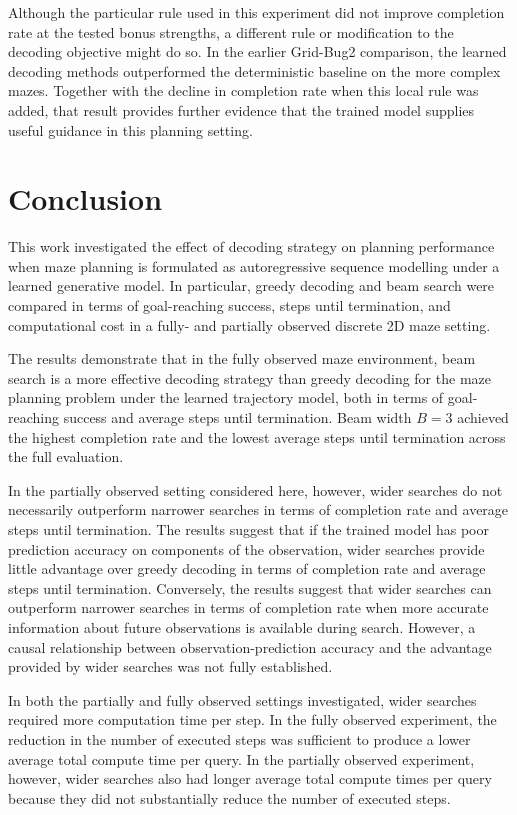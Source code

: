 ﻿\documentclass[12pt,a4paper]{article}
\theoremstyle{definition}
\begin{document}
Although the particular rule used in this experiment did not improve completion rate at the tested
bonus strengths, a different rule or modification to the decoding objective might do so. In the earlier
Grid-Bug2 comparison, the learned decoding methods outperformed the deterministic baseline on the more
complex mazes. Together with the decline in completion rate when this local rule was added, that result
provides further evidence that the trained model supplies useful guidance in this planning setting.


\section{Conclusion}

This work investigated the effect of decoding strategy on planning performance when maze planning is
formulated as autoregressive sequence modelling under a learned generative model. In particular,
greedy decoding and beam search were compared in terms of goal-reaching success, steps until termination,
and computational cost in a fully- and partially observed discrete 2D maze setting.

The results demonstrate that in the fully observed maze environment, beam search is a more effective decoding strategy than greedy
decoding for the maze planning problem under the learned trajectory model, both in terms of
goal-reaching success and average steps until termination. Beam width
$B=3$ achieved the highest completion rate and the lowest average steps until termination across the
full evaluation.

In the partially observed setting considered here, however, wider searches do not necessarily outperform narrower
searches in terms of completion rate and average steps until termination. The results suggest that if
the trained model has poor prediction accuracy on components of the observation, wider searches
provide little advantage over greedy decoding in terms of completion rate and average steps until termination.
Conversely, the results suggest that wider searches can outperform narrower searches in terms 
of completion rate when more accurate information about future observations is available 
during search. However, a causal relationship between observation-prediction accuracy and 
the advantage provided by wider searches was not fully established.

In both the partially and fully observed settings investigated, wider searches required 
more computation time per step. In the fully observed experiment, the reduction in the number 
of executed steps was sufficient to produce a lower average total compute time per query. In 
the partially observed experiment, however, wider searches also had longer average total 
compute times per query because they did not substantially reduce the number of executed 
steps.
\end{document}
